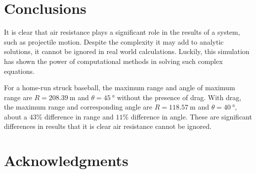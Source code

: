 \documentclass[aps,prl,twocolumn,superscriptaddress]{revtex4-1}
\begin{document}
\section{Conclusions}
It is clear that air resistance plays a significant role in the results of a system, such as projectile motion. Despite the complexity it may add to analytic solutions, it cannot be ignored in real world calculations. Luckily, this simulation has shown the power of computational methods in solving such complex equations.

For a home-run struck baseball, the maximum range and angle of maximum range are $R = \SI{208.39}{\m}$ and $\theta = \SI{45}{\degree}$ without the presence of drag. With drag, the maximum range and corresponding angle are $R = \SI{118.57}{\m}$ and $\theta = \SI{40}{\degree}$, about a $43$\% difference in range and $11$\% difference in angle. These are significant differences in results that it is clear air resistance cannot be ignored.

\section*{Acknowledgments}
\setlength{\parindent}{0cm}



\end{document}
